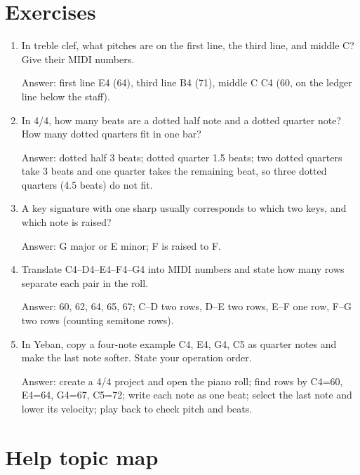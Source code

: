 \section{Exercises}


\begin{exercise}
\begin{enumerate}
  \item In treble clef, what pitches are on the first line, the third line, and middle C? Give their MIDI numbers.
  \par\noindent Answer: first line E4 (64), third line B4 (71), middle C C4 (60, on the ledger line below the staff).
  \item In 4/4, how many beats are a dotted half note and a dotted quarter note? How many dotted quarters fit in one bar?
  \par\noindent Answer: dotted half 3 beats; dotted quarter 1.5 beats; two dotted quarters take 3 beats and one quarter takes the remaining beat, so three dotted quarters (4.5 beats) do not fit.
  \item A key signature with one sharp usually corresponds to which two keys, and which note is raised?
  \par\noindent Answer: G major or E minor; F is raised to F\sharpsym.
  \item Translate C4--D4--E4--F4--G4 into MIDI numbers and state how many rows separate each pair in the roll.
  \par\noindent Answer: 60, 62, 64, 65, 67; C--D two rows, D--E two rows, E--F one row, F--G two rows (counting semitone rows).
  \item In Yeban, copy a four-note example C4, E4, G4, C5 as quarter notes and make the last note softer. State your operation order.
  \par\noindent Answer: create a 4/4 project and open the piano roll; find rows by C4=60, E4=64, G4=67, C5=72; write each note as one beat; select the last note and lower its velocity; play back to check pitch and beats.
\end{enumerate}
\end{exercise}

\section{Help topic map}

